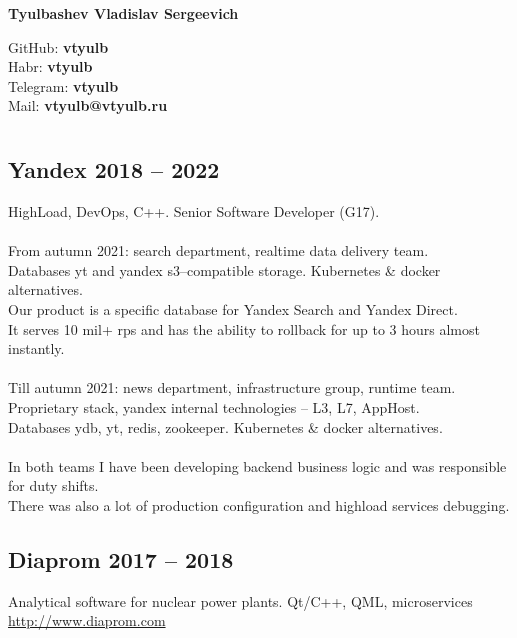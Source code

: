 \documentclass[a4paper, 11pt]{article}
\begin{document}
\begin{center}
    \huge\textbf{Tyulbashev Vladislav Sergeevich}\\
\end{center}
\null\hfill GitHub: \textbf{vtyulb} \\
\null\hfill Habr: \textbf{vtyulb} \\
\null\hfill Telegram: \textbf{vtyulb} \\
\null\hfill Mail: \textbf{vtyulb@vtyulb.ru} \\

\section*{} {
    \subsection*{Yandex 2018 -- 2022} {
        HighLoad, DevOps, C++. Senior Software Developer (G17). \\
        \\
        From autumn 2021: search department, realtime data delivery team. \\
        Databases yt and yandex s3--compatible storage. Kubernetes \& docker alternatives. \\
        Our product is a specific database for Yandex Search and Yandex Direct. \\
        It serves 10 mil+ rps and has the ability to rollback for up to 3 hours almost instantly. \\
        \\
        Till autumn 2021: news department, infrastructure group, runtime team. \\
        Proprietary stack, yandex internal technologies -- L3, L7, AppHost. \\
        Databases ydb, yt, redis, zookeeper. Kubernetes \& docker alternatives. \\
        \\
        In both teams I have been developing backend business logic and was responsible for duty shifts. \\
        There was also a lot of production configuration and highload services debugging.
    }
        
    \subsection*{Diaprom 2017 -- 2018} {
        Analytical software for nuclear power plants. Qt/C++, QML, microservices \\
        \href{http://www.diaprom.com/}{http://www.diaprom.com}
    }
    
}
\end{document}
